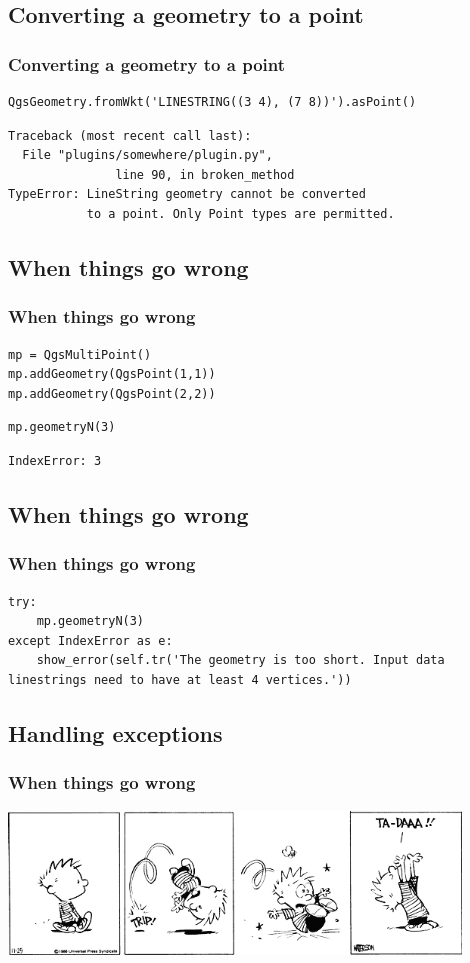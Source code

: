 \subsection{Converting a geometry to a point}
\begin{frame}[fragile]
\frametitle{Converting a geometry to a point}

\begin{lstlisting}[style=pythoncode]
QgsGeometry.fromWkt('LINESTRING((3 4), (7 8))').asPoint()
\end{lstlisting}
\pause
\begin{lstlisting}[style=pythonoutput]
Traceback (most recent call last):
  File "plugins/somewhere/plugin.py", 
               line 90, in broken_method
TypeError: LineString geometry cannot be converted
           to a point. Only Point types are permitted.
\end{lstlisting}
\end{frame}

\subsection{When things go wrong}
\begin{frame}[fragile]
\frametitle{When things go wrong}

\begin{lstlisting}[style=pythoncode]
mp = QgsMultiPoint()
mp.addGeometry(QgsPoint(1,1))
mp.addGeometry(QgsPoint(2,2))
\end{lstlisting}
\pause
\begin{lstlisting}[style=pythoncode]
mp.geometryN(3)
\end{lstlisting}
\pause
\begin{lstlisting}[style=pythonoutput]
IndexError: 3
\end{lstlisting}

\end{frame}


\subsection{When things go wrong}
\begin{frame}[fragile]
\frametitle{When things go wrong}

\begin{lstlisting}[style=pythoncode]
try:
	mp.geometryN(3)
except IndexError as e:
	show_error(self.tr('The geometry is too short. Input data linestrings need to have at least 4 vertices.'))
\end{lstlisting}

\end{frame}


\subsection{Handling exceptions}

\begin{frame}
\frametitle{When things go wrong}
	\includegraphics[width=0.9\textwidth]{img/calvin2.png}
\end{frame}